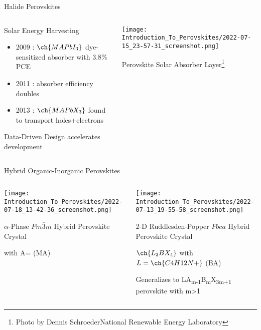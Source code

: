 \documentclass[10pt, compress, aspectratio=169]{beamer}
\begin{document}
\begin{frame}[label={sec:org92eea70}]{Halide Perovskites}
\begin{columns}
\begin{column}{0.4\columnwidth}
\begin{block}{Solar Energy Harvesting}
\begin{itemize}
\item 2009 : \(\ch{MAPbI_3}\) dye-sensitized absorber with 3.8\% PCE
\autocite{kojima-2009-organ-halid}
\item 2011 : absorber efficiency doubles
\autocite{im-2011}
\item 2013 : \(\ch{MAPbX_3}\) found to transport holes+electrons
\autocite{saliba-2014-influen-therm}
\end{itemize}

\alert{Data-Driven Design} accelerates development
\end{block}
\end{column}
\begin{column}{0.6\columnwidth}
\begin{center}
\texttt{[image: Introduction\_To\_Perovskites/2022-07-15\_23-57-31\_screenshot.png]}
\end{center}
Perovskite Solar Absorber Layer\footnote{\tiny{}Photo by Dennis Schroeder\newline{}National Renewable Energy Laboratory}
\end{column}
\end{columns}
\end{frame}
\begin{frame}[allowframebreaks]{Hybrid Organic-Inorganic Perovskites}
\begin{columns}
\begin{column}{0.5\columnwidth}
\begin{center}
\texttt{[image: Introduction\_To\_Perovskites/2022-07-18\_13-42-36\_screenshot.png]}
\end{center}

\(\alpha\)-Phase \(Pm\bar{3}m\) Hybrid Perovskite Crystal
\autocite{yan-2016-defec-physic}

 with A= (MA)
\end{column}
\begin{column}{0.5\columnwidth}
\begin{center}
\texttt{[image: Introduction\_To\_Perovskites/2022-07-13\_19-55-58\_screenshot.png]}
\end{center}
2-D Ruddlesden-Popper \(Pbca\) Hybrid Perovskite Crystal
\autocite{hong-2021-layer-edge}

\(\ch{L_2BX_4}\) with \(L=\ch{C4H12N+}\) (BA)

Generalizes to LA\textsubscript{m-1}B\textsubscript{m}X\textsubscript{3m+1} perovskite with m>1
\end{column}
\end{columns}
\end{frame}
\end{document}
